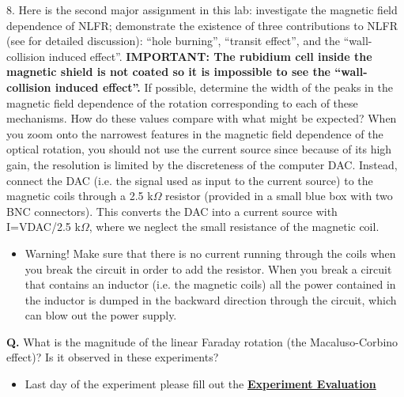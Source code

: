 \documentclass{../lab}
\begin{document}
8. Here is the second major assignment in this lab: investigate the magnetic field dependence of NLFR; demonstrate the existence of three contributions to NLFR (see  for detailed discussion): ``hole burning'', ``transit effect'', and the ``wall-collision induced effect''. \textbf{IMPORTANT: The rubidium cell inside the magnetic shield is not coated so it is impossible to see the ``wall-collision induced effect''.} If possible, determine the width of the peaks in the magnetic field dependence of the rotation corresponding to each of these mechanisms. How do these values compare with what might be expected? When you zoom onto the narrowest features in the magnetic field dependence of the optical rotation, you should not use the current source since because of its high gain, the resolution is limited by the discreteness of the computer DAC. Instead, connect the DAC (i.e. the signal used as input to the current source) to the magnetic coils through a 2.5 k$ \Omega $ resistor (provided in a small blue box with two BNC connectors). This converts the DAC into a current source with I=VDAC/2.5 k$ \Omega $, where we neglect the small resistance of the magnetic coil.

\begin{itemize}
    \item Warning! Make sure that there is no current running through the coils when you break the circuit in order to add the resistor. When you break a circuit that contains an inductor (i.e. the magnetic coils) all the power contained in the inductor is dumped in the backward direction through the circuit, which can blow out the power supply.

\end{itemize}

\textbf{Q.} What is the magnitude of the linear Faraday rotation (the Macaluso-Corbino effect)? Is it observed in these experiments?

\begin{itemize}
    \item Last day of the experiment please fill out the \href{\ExperimentEvaluation}{\textbf{Experiment Evaluation}}

\end{itemize}
\end{document}

